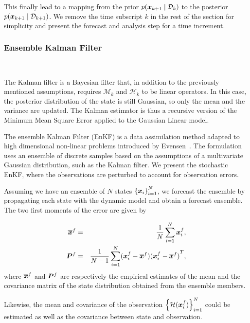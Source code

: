 This finally lead to a mapping from the prior $p(\bm{x}_{k+1} \mid \mathcal D_k)$ to the posterior $p(\bm{x}_{k+1} \mid \mathcal D_{k+1})$.
We remove the time subscript $k$ in the rest of the section for simplicity and present the forecast and analysis step for a time increment.

\subsubsection{Ensemble Kalman Filter}~{\label{enkf}}

The Kalman filter \cite{kalman_new_1960} is a Bayesian filter that, in addition to the previously mentioned assumptions, requires $\mathcal{M}_k$ and $\mathcal{H}_k$ to be linear operators. In this case, the posterior distribution of the state is still Gaussian, so only the mean and the variance are updated. The Kalman estimator is thus a recursive version of the Minimum Mean Square Error applied to the Gaussian Linear model.

The ensemble Kalman Filter (EnKF) is a data assimilation method adapted to high dimensional non-linear problems introduced by Evensen~\cite{evensen_sequential_1994}. The formulation uses an ensemble of discrete samples based on the assumptions of a multivariate Gaussian distribution, such as the Kalman filter. We present the stochastic EnKF, where the observations are perturbed to account for observation errors.

Assuming we have an ensemble of $N$ states $\left\{\bm {\bm{x}}_i \right\}_{i=1}^N$, we forecast the ensemble by propagating each state with the dynamic model and obtain a forecast ensemble.
The two first moments of the error are given by

\begin{eqnarray*}
    \overline{\bm{x}}^f &=& \frac{1}{N} \sum_{i = 1}^{N} \bm{x}_i^f, \\
    \bm{P}^f &=& \frac{1}{N-1} \sum_{i = 1}^{N} (\bm{x}_i^f - \overline{\bm{x}}^f){(\bm{x}_i^f - \overline{\bm{x}}^f)}^T,
\end{eqnarray*}
where $\overline{\bm{x}}^f$ and $\bm{P}^f$ are respectively the empirical estimates of the mean and  the covariance matrix of the state distribution obtained from the ensemble members.

Likewise, the mean and covariance of the observation $\left\{\mathcal{H}(\bm{x}_i^f) \right\}_{i=1}^N$ could be estimated as well as the covariance between state and observation.

